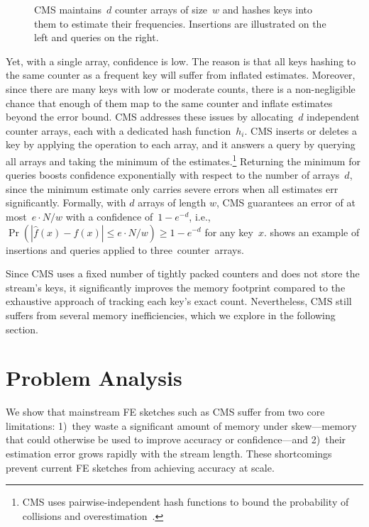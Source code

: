 \documentclass[sigconf]{acmart}
\begin{document}
\begin{figure}
\begin{tikzpicture}
    \end{tikzpicture}
    \iftods
        \vspace{-2mm}
    \fi
    \caption{CMS maintains~$d$ counter arrays of size~$w$ and hashes keys into
    them to estimate their frequencies. Insertions are illustrated on the left
    and queries on the right.}
    \iftods
        \vspace{-4mm}
    \fi
    \label{fig:cms_overview}
\end{figure}

Yet, with a single array, confidence is low. The reason is that all keys
hashing to the same counter as a frequent key will suffer from inflated
estimates. Moreover, since there are many keys with low or moderate counts,
there is a non-negligible chance that enough of them map to the same counter
and inflate estimates beyond the error bound. CMS addresses these issues by
allocating~$d$ independent counter arrays, each with a dedicated hash
function~$h_i$. CMS inserts or deletes a key by applying the operation to each
array, and it answers a query by querying all arrays and taking the minimum of
the estimates.\footnote{CMS uses pairwise-independent hash functions to bound
the probability of collisions and overestimation~\cite{CountMin}.} Returning
the minimum for queries boosts confidence exponentially with respect to the
number of arrays~$d$, since the minimum estimate only carries severe errors
when all estimates err significantly. Formally, with $d$ arrays of length $w$,
CMS guarantees an error of at most~$e \cdot N/w$ with a confidence
of~$1-e^{-d}$, i.e., $\Pr(|\hat{f}(x)-f(x)| \leq e \cdot N/w) \geq 1-e^{-d}$
for any key~$x$. 
shows an example of insertions and queries applied to three~counter~arrays.

Since CMS uses a fixed number of tightly packed counters and does not store the
stream's keys, it significantly improves the memory footprint compared to the
exhaustive approach of tracking each key's exact count. Nevertheless, CMS still
suffers from several memory inefficiencies, which we explore in the following
section.

\section{Problem Analysis}\label{sec:problem_analysis}
We show that mainstream FE sketches such as CMS suffer from two core limitations: 
1)~they waste a significant amount of memory under skew---memory that could otherwise be used to improve accuracy or confidence---and 
2)~their estimation error grows rapidly with the stream length.
These shortcomings prevent current FE sketches from achieving accuracy at scale.
\end{document}
